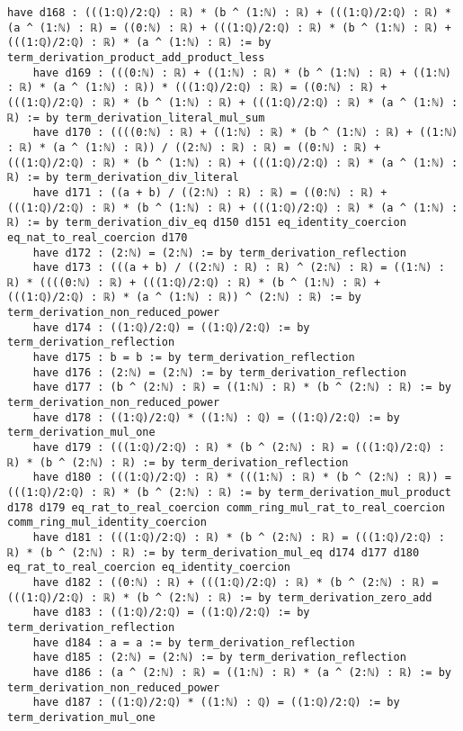 \documentclass{article}
\begin{document}
\begin{tcolorbox}[colback=white!10, width=\linewidth]
\begin{lstlisting}[language=Lean4]
    have d168 : (((1:ℚ)/2:ℚ) : ℝ) * (b ^ (1:ℕ) : ℝ) + (((1:ℚ)/2:ℚ) : ℝ) * (a ^ (1:ℕ) : ℝ) = ((0:ℕ) : ℝ) + (((1:ℚ)/2:ℚ) : ℝ) * (b ^ (1:ℕ) : ℝ) + (((1:ℚ)/2:ℚ) : ℝ) * (a ^ (1:ℕ) : ℝ) := by term_derivation_product_add_product_less
    have d169 : (((0:ℕ) : ℝ) + ((1:ℕ) : ℝ) * (b ^ (1:ℕ) : ℝ) + ((1:ℕ) : ℝ) * (a ^ (1:ℕ) : ℝ)) * (((1:ℚ)/2:ℚ) : ℝ) = ((0:ℕ) : ℝ) + (((1:ℚ)/2:ℚ) : ℝ) * (b ^ (1:ℕ) : ℝ) + (((1:ℚ)/2:ℚ) : ℝ) * (a ^ (1:ℕ) : ℝ) := by term_derivation_literal_mul_sum
    have d170 : ((((0:ℕ) : ℝ) + ((1:ℕ) : ℝ) * (b ^ (1:ℕ) : ℝ) + ((1:ℕ) : ℝ) * (a ^ (1:ℕ) : ℝ)) / ((2:ℕ) : ℝ) : ℝ) = ((0:ℕ) : ℝ) + (((1:ℚ)/2:ℚ) : ℝ) * (b ^ (1:ℕ) : ℝ) + (((1:ℚ)/2:ℚ) : ℝ) * (a ^ (1:ℕ) : ℝ) := by term_derivation_div_literal
    have d171 : ((a + b) / ((2:ℕ) : ℝ) : ℝ) = ((0:ℕ) : ℝ) + (((1:ℚ)/2:ℚ) : ℝ) * (b ^ (1:ℕ) : ℝ) + (((1:ℚ)/2:ℚ) : ℝ) * (a ^ (1:ℕ) : ℝ) := by term_derivation_div_eq d150 d151 eq_identity_coercion eq_nat_to_real_coercion d170
    have d172 : (2:ℕ) = (2:ℕ) := by term_derivation_reflection
    have d173 : (((a + b) / ((2:ℕ) : ℝ) : ℝ) ^ (2:ℕ) : ℝ) = ((1:ℕ) : ℝ) * ((((0:ℕ) : ℝ) + (((1:ℚ)/2:ℚ) : ℝ) * (b ^ (1:ℕ) : ℝ) + (((1:ℚ)/2:ℚ) : ℝ) * (a ^ (1:ℕ) : ℝ)) ^ (2:ℕ) : ℝ) := by term_derivation_non_reduced_power
    have d174 : ((1:ℚ)/2:ℚ) = ((1:ℚ)/2:ℚ) := by term_derivation_reflection
    have d175 : b = b := by term_derivation_reflection
    have d176 : (2:ℕ) = (2:ℕ) := by term_derivation_reflection
    have d177 : (b ^ (2:ℕ) : ℝ) = ((1:ℕ) : ℝ) * (b ^ (2:ℕ) : ℝ) := by term_derivation_non_reduced_power
    have d178 : ((1:ℚ)/2:ℚ) * ((1:ℕ) : ℚ) = ((1:ℚ)/2:ℚ) := by term_derivation_mul_one
    have d179 : (((1:ℚ)/2:ℚ) : ℝ) * (b ^ (2:ℕ) : ℝ) = (((1:ℚ)/2:ℚ) : ℝ) * (b ^ (2:ℕ) : ℝ) := by term_derivation_reflection
    have d180 : (((1:ℚ)/2:ℚ) : ℝ) * (((1:ℕ) : ℝ) * (b ^ (2:ℕ) : ℝ)) = (((1:ℚ)/2:ℚ) : ℝ) * (b ^ (2:ℕ) : ℝ) := by term_derivation_mul_product d178 d179 eq_rat_to_real_coercion comm_ring_mul_rat_to_real_coercion comm_ring_mul_identity_coercion
    have d181 : (((1:ℚ)/2:ℚ) : ℝ) * (b ^ (2:ℕ) : ℝ) = (((1:ℚ)/2:ℚ) : ℝ) * (b ^ (2:ℕ) : ℝ) := by term_derivation_mul_eq d174 d177 d180 eq_rat_to_real_coercion eq_identity_coercion
    have d182 : ((0:ℕ) : ℝ) + (((1:ℚ)/2:ℚ) : ℝ) * (b ^ (2:ℕ) : ℝ) = (((1:ℚ)/2:ℚ) : ℝ) * (b ^ (2:ℕ) : ℝ) := by term_derivation_zero_add
    have d183 : ((1:ℚ)/2:ℚ) = ((1:ℚ)/2:ℚ) := by term_derivation_reflection
    have d184 : a = a := by term_derivation_reflection
    have d185 : (2:ℕ) = (2:ℕ) := by term_derivation_reflection
    have d186 : (a ^ (2:ℕ) : ℝ) = ((1:ℕ) : ℝ) * (a ^ (2:ℕ) : ℝ) := by term_derivation_non_reduced_power
    have d187 : ((1:ℚ)/2:ℚ) * ((1:ℕ) : ℚ) = ((1:ℚ)/2:ℚ) := by term_derivation_mul_one

\end{lstlisting}
\end{tcolorbox}
\end{document}
